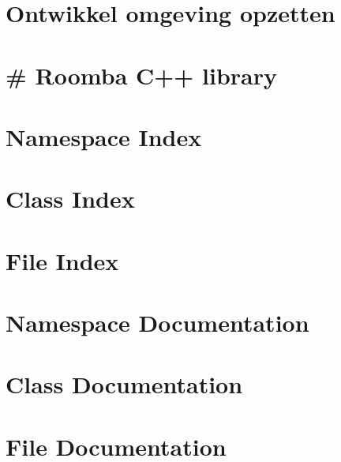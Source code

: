 \documentclass[twoside]{book}
\newcommand{\+}{\discretionary{\mbox{\scriptsize$\hookleftarrow$}}{}{}}
\newcommand{\clearemptydoublepage}{%
    \newpage{\pagestyle{empty}\cleardoublepage}%
  }
\begin{document}
\chapter{Ontwikkel omgeving opzetten}
\label{md__c___users_crtak__roomba_project_cpp__documentatie__m_d__omgeving_opzetten}

\chapter{\# Roomba C++ library}
\label{md__c___users_crtak__roomba_project_cpp__r_e_a_d_m_e}

\chapter{Namespace Index}

\chapter{Class Index}

\chapter{File Index}

\chapter{Namespace Documentation}

\chapter{Class Documentation}



\chapter{File Documentation}























  \backmatter
  \newpage
  \clearemptydoublepage
  \printindex
\end{document}
